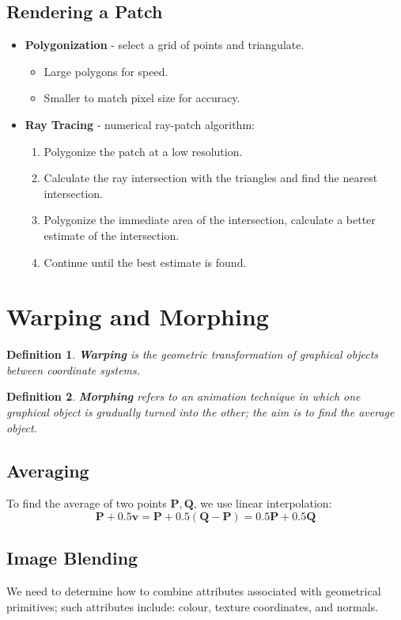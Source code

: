 \documentclass[11pt]{article}
\newtheorem{defn}{Definition}
\begin{document}
\subsection{Rendering a Patch}
\begin{itemize}
  \item \textbf{Polygonization} - select a grid of points and triangulate.
    \begin{itemize}
      \item Large polygons for speed.
      \item Smaller to match pixel size for accuracy.
    \end{itemize}
  \item \textbf{Ray Tracing} - numerical ray-patch algorithm:
    \begin{enumerate}
      \item Polygonize the patch at a low resolution.
      \item Calculate the ray intersection with the triangles and find the nearest intersection.
      \item Polygonize the immediate area of the intersection, calculate a better estimate of the intersection.
      \item Continue until the best estimate is found.
    \end{enumerate}
\end{itemize}

\section{Warping and Morphing}
\begin{defn}
  \textbf{Warping} is the geometric transformation of graphical objects between coordinate systems.
\end{defn}

\begin{defn}
  \textbf{Morphing} refers to an animation technique in which one graphical object is gradually turned into the other; the aim is to find the average object.
\end{defn}

\subsection{Averaging}
To find the average of two points $\bm{P}, \bm{Q}$, we use linear interpolation:
\[
  \bm{P} + 0.5\bm{v} = \bm{P} + 0.5(\bm{Q} - \bm{P}) = 0.5\bm{P} + 0.5\bm{Q} 
\]

\subsection{Image Blending}
We need to determine how to combine attributes associated with geometrical primitives; such attributes include: colour, texture coordinates, and normals.
\end{document}
